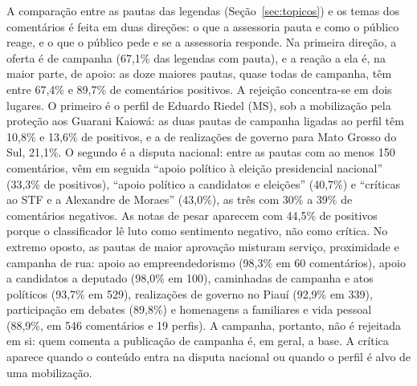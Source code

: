 A comparação entre as pautas das legendas (Seção~\ref{sec:topicos}) e os temas dos comentários é feita em duas direções: o que a assessoria pauta e como o público reage, e o que o público pede e se a assessoria responde. Na primeira direção, a oferta é de campanha (67,1\% das legendas com pauta), e a reação a ela é, na maior parte, de apoio: as doze maiores pautas, quase todas de campanha, têm entre 67,4\% e 89,7\% de comentários positivos. A rejeição concentra-se em dois lugares. O primeiro é o perfil de Eduardo Riedel (MS), sob a mobilização pela proteção aos Guarani Kaiowá: as duas pautas de campanha ligadas ao perfil têm 10,8\% e 13,6\% de positivos, e a de realizações de governo para Mato Grosso do Sul, 21,1\%. O segundo é a disputa nacional: entre as pautas com ao menos 150 comentários, vêm em seguida ``apoio político à eleição presidencial nacional'' (33,3\% de positivos), ``apoio político a candidatos e eleições'' (40,7\%) e ``críticas ao STF e a Alexandre de Moraes'' (43,0\%), as três com 30\% a 39\% de comentários negativos. As notas de pesar aparecem com 44,5\% de positivos porque o classificador lê luto como sentimento negativo, não como crítica. No extremo oposto, as pautas de maior aprovação misturam serviço, proximidade e campanha de rua: apoio ao empreendedorismo (98,3\% em 60 comentários), apoio a candidatos a deputado (98,0\% em 100), caminhadas de campanha e atos políticos (93,7\% em 529), realizações de governo no Piauí (92,9\% em 339), participação em debates (89,8\%) e homenagens a familiares e vida pessoal (88,9\%, em 546 comentários e 19 perfis). A campanha, portanto, não é rejeitada em si: quem comenta a publicação de campanha é, em geral, a base. A crítica aparece quando o conteúdo entra na disputa nacional ou quando o perfil é alvo de uma mobilização.


